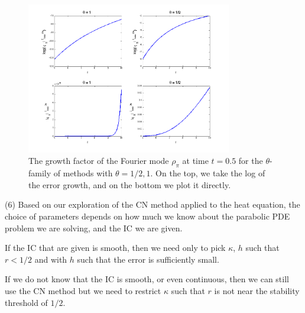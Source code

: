 \documentclass[11pt]{article}
\begin{document}
\begin{enumerate}
\begin{figure}[h!]
  \centering
    \includegraphics[width=0.8\textwidth]{andy_hw13_prb05_05.png}
  \caption{The growth factor of the Fourier mode $\rho _\pi$ at time $t = 0.5$ for the $\theta$-family of methods with $\theta = 1/2,1$.
           On the top, we take the log of the error growth, and on the bottom we plot it directly.}
\end{figure}

(6) Based on our exploration of the CN method applied to the heat equation, the choice of parameters depends on how much we know about the parabolic PDE problem we are solving, and the IC we are given.

If the IC that are given is smooth, then we need only to pick $\kappa$, $h$ such that $r<1/2$ and with $h$ such that the error is sufficiently small.

If we do not know that the IC is smooth, or even continuous, then we can still use the CN method but we need to restrict $\kappa$ such that $r$ is not near the stability threshold of $1/2$.

\end{enumerate}
\end{document}
